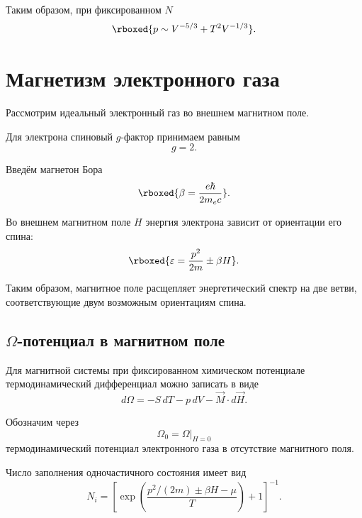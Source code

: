 \documentclass[../final.tex]{subfiles}
\begin{document}
Таким образом, при фиксированном $N$
%
\[
    \rboxed{
        p
        \sim
        V^{-5/3}
        +
        T^2V^{-1/3}
    }.
\]


\section{Магнетизм электронного газа}

Рассмотрим идеальный электронный газ во внешнем магнитном поле.

Для электрона спиновый $g$-фактор принимаем равным
%
\begin{equation*}
    g
    =
    2.
\end{equation*}

Введём магнетон Бора
%
\[
    \rboxed{
        \beta
        =
        \frac{
            e\hbar
        }{
            2m_ec
        }
    }.
\]

Во внешнем магнитном поле $H$ энергия электрона зависит от ориентации
его спина:
%
\[
    \rboxed{
        \varepsilon
        =
        \frac{p^2}{2m}
        \pm
        \beta H
    }.
\]

Таким образом, магнитное поле расщепляет энергетический спектр
на две ветви, соответствующие двум возможным ориентациям спина.


\subsection{\texorpdfstring{$\Omega$}{Omega}-потенциал в магнитном поле}

Для магнитной системы при фиксированном химическом потенциале
термодинамический дифференциал можно записать в виде
%
\begin{equation*}
    d\Omega
    =
    -S\,dT
    -
    p\,dV
    -
    \vec M\cdot d\vec H.
\end{equation*}

Обозначим через
%
\begin{equation*}
    \Omega_0
    =
    \left.
        \Omega
    \right|_{H=0}
\end{equation*}
%
термодинамический потенциал электронного газа в отсутствие
магнитного поля.

Число заполнения одночастичного состояния имеет вид
%
\begin{equation*}
    N_i
    =
    \left[
        \exp
        \left(
            \frac{
                p^2/(2m)
                \pm
                \beta H
                -
                \mu
            }{
                T
            }
        \right)
        +1
    \right]^{-1}.
\end{equation*}
\end{document}
